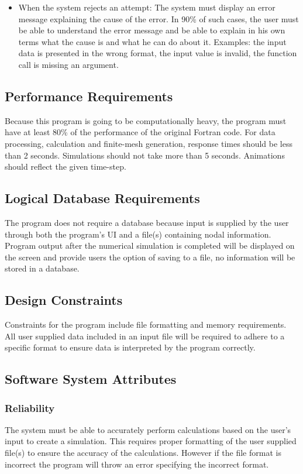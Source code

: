 \documentclass[draftclsnofoot,onecolumn,letterpaper,10pt,compsoc]{IEEEtran}
\begin{document}
\begin{itemize}
    \item When the system rejects an attempt: The system must display an error message explaining the cause of the error. In 90\% of such cases, the user must be able to understand the error message and be able to explain in his own terms what the cause is and what he can do about it. Examples: the input data is presented in the wrong format, the input value is invalid, the function call is missing an argument.
\end{itemize}

\subsection{Performance Requirements}
Because this program is going to be computationally heavy, the program must have at least 80\% of the performance of the original Fortran code. For data processing, calculation and finite-mesh generation, response times should be less than 2 seconds. Simulations should not take more than 5 seconds. Animations should reflect the given time-step.

\subsection{Logical Database Requirements}
The program does not require a database because input is supplied by the user through both the program's UI and a file(s) containing nodal information. Program output after the numerical simulation is completed will be displayed on the screen and provide users the option of saving to a file, no information will be stored in a database.

\subsection{Design Constraints}
Constraints for the program include file formatting and memory requirements. All user supplied data included in an input file will be required to adhere to a specific format to ensure data is interpreted by the program correctly.

\subsection{Software System Attributes}
\subsubsection{Reliability}
The system must be able to accurately perform calculations based on the user's input to create a simulation. This requires proper formatting of the user supplied file(s) to ensure the accuracy of the calculations. However if the file format is incorrect the program will throw an error specifying the incorrect format.
\end{document}

